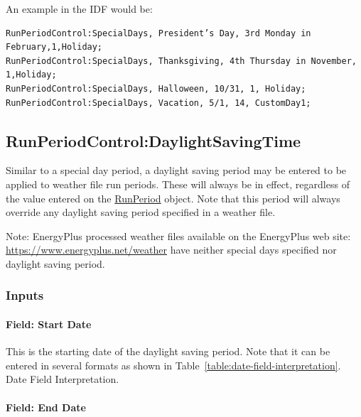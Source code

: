 An example in the IDF would be:

\begin{lstlisting}
RunPeriodControl:SpecialDays, President’s Day, 3rd Monday in February,1,Holiday;
RunPeriodControl:SpecialDays, Thanksgiving, 4th Thursday in November, 1,Holiday;
RunPeriodControl:SpecialDays, Halloween, 10/31, 1, Holiday;
RunPeriodControl:SpecialDays, Vacation, 5/1, 14, CustomDay1;
\end{lstlisting}

\subsection{RunPeriodControl:DaylightSavingTime}\label{runperiodcontroldaylightsavingtime}

Similar to a special day period, a daylight saving period may be entered to be applied to weather file run periods. These will always be in effect, regardless of the value entered on the \hyperref[runperiod]{RunPeriod} object. Note that this period will always override any daylight saving period specified in a weather file.

\begin{callout}
Note: EnergyPlus processed weather files available on the EnergyPlus web site: \url{https://www.energyplus.net/weather} have neither special days specified nor daylight saving period.

\end{callout}

\subsubsection{Inputs}\label{inputs-7-013}

\paragraph{Field: Start Date}\label{field-start-date-1}

This is the starting date of the daylight saving period. Note that it can be entered in several formats as shown in Table~\ref{table:date-field-interpretation}. Date Field Interpretation.

\paragraph{Field: End Date}\label{field-end-date}

